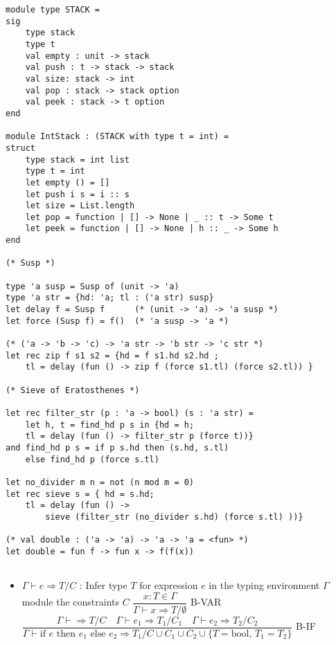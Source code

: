 \documentclass[12pt]{article}
\begin{document}
\pagebreak

\begin{multicols}{2}

\begin{lstlisting}
module type STACK =
sig
    type stack
    type t
    val empty : unit -> stack
    val push : t -> stack -> stack
    val size: stack -> int
    val pop : stack -> stack option
    val peek : stack -> t option
end

module IntStack : (STACK with type t = int) =
struct
    type stack = int list
    type t = int
    let empty () = []
    let push i s = i :: s
    let size = List.length
    let pop = function | [] -> None | _ :: t -> Some t
    let peek = function | [] -> None | h :: _ -> Some h
end

(* Susp *)

type 'a susp = Susp of (unit -> 'a)
type 'a str = {hd: 'a; tl : ('a str) susp}
let delay f = Susp f      (* (unit -> 'a) -> 'a susp *)
let force (Susp f) = f()  (* 'a susp -> 'a *)

(* ('a -> 'b -> 'c) -> 'a str -> 'b str -> 'c str *)
let rec zip f s1 s2 = {hd = f s1.hd s2.hd ; 
    tl = delay (fun () -> zip f (force s1.tl) (force s2.tl)) }

(* Sieve of Eratosthenes *)

let rec filter_str (p : 'a -> bool) (s : 'a str) =
    let h, t = find_hd p s in {hd = h; 
    tl = delay (fun () -> filter_str p (force t))}
and find_hd p s = if p s.hd then (s.hd, s.tl)
    else find_hd p (force s.tl)

let no_divider m n = not (n mod m = 0)    
let rec sieve s = { hd = s.hd; 
    tl = delay (fun () -> 
        sieve (filter_str (no_divider s.hd) (force s.tl) ))}

(* val double : ('a -> 'a) -> 'a -> 'a = <fun> *)
let double = fun f -> fun x -> f(f(x))


\end{lstlisting}
\vspace{1cm}
\begin{itemize}[noitemsep,nosep]
    \item $\Gamma \vdash e \Rightarrow T/C$ : Infer type $T$ for expression $e$ in the typing environment $\Gamma$ module the constraints $C$
    \vspace{1mm}
    $\dfrac{x : T \in \Gamma}{\Gamma \vdash x \Rightarrow T/\emptyset}$ B-VAR
    $\dfrac{\Gamma \vdash \Rightarrow T/C \quad \Gamma \vdash e_1 \Rightarrow T_1/C_1 \quad \Gamma \vdash e_2 \Rightarrow T_2/C_2}{\Gamma \vdash \text{if } e \text{ then } e_1 \text{ else } e_2 \Rightarrow T_1/C \cup C_1 \cup C_2 \cup \{T = \text{bool, } T_1 = T_2\}}$ B-IF
\end{itemize}


\end{multicols}
\end{document}
